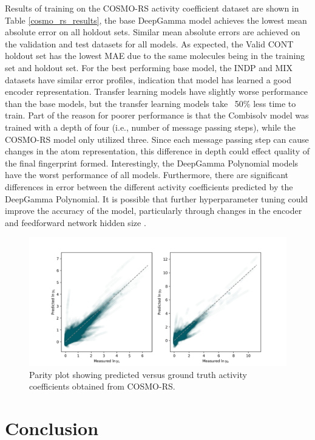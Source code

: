 Results of training on the COSMO-RS activity coefficient dataset are shown in Table \ref{cosmo_rs_results}, the base DeepGamma model achieves the lowest mean absolute error on all holdout sets. Similar mean absolute errors are achieved on the validation and test datasets for all models. As expected, the Valid CONT holdout set has the lowest MAE due to the same molecules being in the training set and holdout set.  For the best performing base model, the INDP and MIX datasets have similar error profiles, indication that model has learned a good encoder representation.  Transfer learning models have slightly worse performance than the base models, but the transfer learning models take ~50\% less time to train. Part of the reason for poorer performance is that the Combisolv model was trained with a depth of four (i.e., number of message passing steps), while the COSMO-RS model only utilized three. Since each message passing step can cause changes in the atom representation, this difference in depth could effect quality of the final fingerprint formed. Interestingly, the DeepGamma Polynomial models have the worst performance of all models. Furthermore, there are significant differences in error between the different activity coefficients predicted by the DeepGamma Polynomial.  It is possible that further hyperparameter tuning could improve the accuracy of the model, particularly through changes in the encoder and feedforward network hidden size \cite{Yang2019, Vermeire2021}.

\begin{figure}[t]
    \centering
    \includegraphics[width=\textwidth]{gfx/Chapter07/cosmo_base_test_indp_parity_plot.png}
    \caption{Parity plot showing predicted versus ground truth activity coefficients obtained from COSMO-RS.}
    \label{fig:my_label}
\end{figure}


\section{Conclusion}

